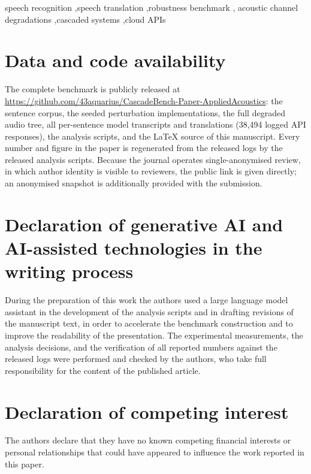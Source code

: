 \documentclass[review,number,sort&compress]{elsarticle}
\begin{document}
\begin{frontmatter}
\begin{keyword}
speech recognition \sep speech translation \sep robustness benchmark \sep
acoustic channel degradations \sep cascaded systems \sep cloud APIs
\end{keyword}

\end{frontmatter}









\section*{Data and code availability}
The complete benchmark is publicly released at
\url{https://github.com/43aquarius/CascadeBench-Paper-AppliedAcoustics}:
the sentence corpus, the seeded perturbation implementations, the full
degraded audio tree, all per-sentence model transcripts and translations
(38{,}494 logged API responses), the analysis scripts, and the LaTeX source
of this manuscript. Every number and figure in the paper is regenerated
from the released logs by the released analysis scripts. Because the
journal operates single-anonymised review, in which author identity is
visible to reviewers, the public link is given directly; an anonymised
snapshot is additionally provided with the submission.

\section*{Declaration of generative AI and AI-assisted technologies in the
writing process}
During the preparation of this work the authors used a large language model
assistant in the development of the analysis scripts and in drafting
revisions of the manuscript text, in order to accelerate the benchmark
construction and to improve the readability of the presentation. The
experimental measurements, the analysis decisions, and the verification of
all reported numbers against the released logs were performed and checked by
the authors, who take full responsibility for the content of the published
article.

\section*{Declaration of competing interest}
The authors declare that they have no known competing financial interests or
personal relationships that could have appeared to influence the work reported
in this paper.



\end{document}

